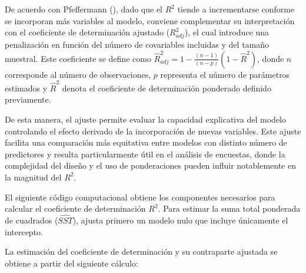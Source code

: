 \documentclass[
  spanish,
  11pt,
  letterpaper,
  oneside,
  open=any]{scrbook}
\newenvironment{Shaded}{\begin{snugshade}}{\end{snugshade}}
\newcommand{\AttributeTok}[1]{\textcolor[rgb]{0.40,0.45,0.13}{#1}}
\newcommand{\DecValTok}[1]{\textcolor[rgb]{0.68,0.00,0.00}{#1}}
\newcommand{\FunctionTok}[1]{\textcolor[rgb]{0.28,0.35,0.67}{#1}}
\newcommand{\NormalTok}[1]{\textcolor[rgb]{0.00,0.23,0.31}{#1}}
\newcommand{\OtherTok}[1]{\textcolor[rgb]{0.00,0.23,0.31}{#1}}
\newcommand{\SpecialCharTok}[1]{\textcolor[rgb]{0.37,0.37,0.37}{#1}}
\begin{document}
De acuerdo con Pfeffermann
(), dado que el \(R^{2}\)
tiende a incrementarse conforme se incorporan más variables al modelo,
conviene complementar su interpretación con el coeficiente de
determinación ajustado (\(R_{adj}^{2}\)), el cual introduce una
penalización en función del número de covariables incluidas y del tamaño
muestral. Este coeficiente se define como
\(\hat{R}^2_{adj} = 1 - \frac{(n-1)}{(n-p)}(1 - \hat{R}^2)\), donde
\(n\) corresponde al número de observaciones, \(p\) representa el número
de parámetros estimados y \(\hat{R}^{2}\) denota el coeficiente de
determinación ponderado definido previamente.

De esta manera, el ajuste permite evaluar la capacidad explicativa del
modelo controlando el efecto derivado de la incorporación de nuevas
variables. Este ajuste facilita una comparación más equitativa entre
modelos con distinto número de predictores y resulta particularmente
útil en el análisis de encuestas, donde la complejidad del diseño y el
uso de ponderaciones pueden influir notablemente en la magnitud del
\(R^{2}\).

El siguiente código computacional obtiene los componentes necesarios
para calcular el coeficiente de determinación \(R^{2}\). Para estimar la
suma total ponderada de cuadrados (\(\widehat{SST}\)), ajusta primero un
modelo nulo que incluye únicamente el intercepto.

\begin{Shaded}
\end{Shaded}

La estimación del coeficiente de determinación y su contraparte ajustada
se obtiene a partir del siguiente cálculo:
\end{document}
